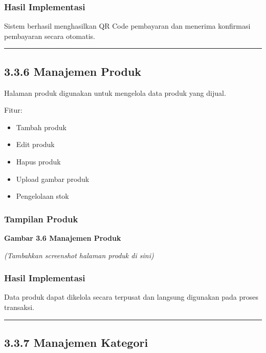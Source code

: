 \subsubsection{Hasil Implementasi}\label{hasil-implementasi-3}

Sistem berhasil menghasilkan QR Code pembayaran dan menerima konfirmasi pembayaran secara otomatis.

\begin{center}\rule{0.5\linewidth}{0.5pt}\end{center}

\subsection{3.3.6 Manajemen Produk}\label{manajemen-produk-1}

Halaman produk digunakan untuk mengelola data produk yang dijual.

Fitur:

\begin{itemize}
\tightlist
\item
  Tambah produk
\item
  Edit produk
\item
  Hapus produk
\item
  Upload gambar produk
\item
  Pengelolaan stok
\end{itemize}

\subsubsection{Tampilan Produk}\label{tampilan-produk}

\textbf{Gambar 3.6 Manajemen Produk}

\emph{(Tambahkan screenshot halaman produk di sini)}

\subsubsection{Hasil Implementasi}\label{hasil-implementasi-4}

Data produk dapat dikelola secara terpusat dan langsung digunakan pada proses transaksi.

\begin{center}\rule{0.5\linewidth}{0.5pt}\end{center}

\subsection{3.3.7 Manajemen Kategori}\label{manajemen-kategori-1}

